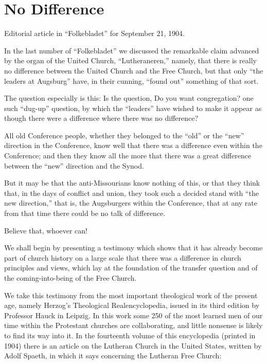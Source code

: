 
\section{No Difference}

Editorial article in “Folkebladet” for September 21, 1904.

In the last number of “Folkebladet” we discussed the remarkable claim advanced by the organ of the United Church, “Lutheraneren,” namely, that there is really no difference between the United Church and the Free Church, but that only “the leaders at Augsburg” have, in their cunning, “found out” something of that sort.

The question especially is this: Is the question, Do you want congregation? one such “dug-up” question, by which the “leaders” have wished to make it appear as though there were a difference where there was no difference?

All old Conference people, whether they belonged to the “old” or the “new” direction in the Conference, know well that there was a difference even within the Conference; and then they know all the more that there was a great difference between the “new” direction and the Synod.

But it may be that the anti-Missourians know nothing of this, or that they think that, in the days of conflict and union, they took such a decided stand with “the new direction,” that is, the Augsburgers within the Conference, that at any rate from that time there could be no talk of difference.

Believe that, whoever can!

We shall begin by presenting a testimony which shows that it has already become part of church history on a large scale that there was a difference in church principles and views, which lay at the foundation of the transfer question and of the coming-into-being of the Free Church.

We take this testimony from the most important theological work of the present age, namely Herzog’s Theological Realencyclopedia, issued in its third edition by Professor Hauck in Leipzig. In this work some 250 of the most learned men of our time within the Protestant churches are collaborating, and little nonsense is likely to find its way into it. In the fourteenth volume of this encyclopedia (printed in 1904) there is an article on the Lutheran Church in the United States, written by Adolf Spaeth, in which it says concerning the Lutheran Free Church:

